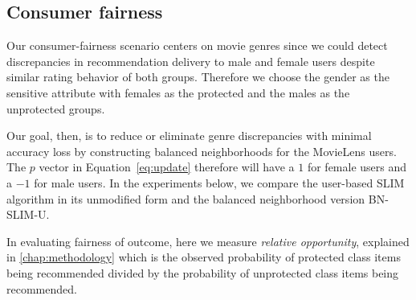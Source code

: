 \subsection{Consumer fairness}

Our consumer-fairness scenario centers on movie genres since we could detect discrepancies in recommendation delivery to male and female users despite similar rating behavior of both groups. Therefore we choose the gender as the sensitive attribute with females as the protected and the males as the unprotected groups.



Our goal, then, is to reduce or eliminate genre discrepancies with minimal accuracy loss by constructing balanced neighborhoods for the MovieLens users. The $p$ vector in Equation~\ref{eq:update} therefore will have a $1$ for female users and a $-1$ for male users. In the experiments below, we compare the user-based SLIM algorithm in its unmodified form and the balanced neighborhood version BN-SLIM-U.

In evaluating fairness of outcome, here we measure \textit{relative opportunity}, explained in \ref{chap:methodology} which is the observed probability of protected class items being recommended divided by the probability of unprotected class items being recommended. 

